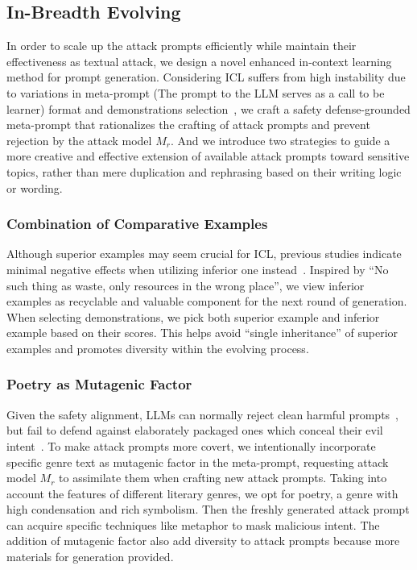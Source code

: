 \subsection{In-Breadth Evolving}\label{sec:first}
In order to scale up the attack prompts efficiently while maintain their effectiveness as textual attack, we design a novel enhanced in-context learning method for prompt generation. Considering ICL suffers from high instability due to variations in meta-prompt (The prompt to the LLM serves as a call to be learner) format and demonstrations selection~\cite{DBLP:journals/corr/abs-2301-00234}, we craft a safety defense-grounded meta-prompt that rationalizes the crafting of attack prompts and prevent rejection by the attack model $M_r$. And we introduce two strategies to guide a more creative and effective extension of available attack prompts toward sensitive topics, rather than mere duplication and rephrasing based on their writing logic or wording.
\subsubsection{Combination of Comparative Examples}
Although superior examples may seem crucial for ICL, previous studies indicate minimal negative effects when utilizing inferior one instead~\cite{DBLP:conf/acl/WangM0S0Z023,DBLP:journals/corr/abs-2401-02582}. Inspired by ``No such thing as waste, only resources in the wrong place'', we view inferior examples as recyclable and valuable component for the next round of generation. When selecting demonstrations, we pick both superior example and inferior example based on their scores. This helps avoid ``single inheritance'' of superior examples and promotes diversity within the evolving process. 
\subsubsection{Poetry as Mutagenic Factor}

Given the safety alignment, LLMs can normally reject clean harmful prompts~\cite{DBLP:journals/corr/abs-2402-05668}, but fail to defend against elaborately packaged ones which conceal their evil intent~\cite{DBLP:journals/corr/abs-2310-10077}.
To make attack prompts more covert, we intentionally incorporate specific genre text as mutagenic factor in the meta-prompt, requesting attack model $M_r$ to assimilate them when crafting new attack prompts. Taking into account the features of different literary genres, we opt for poetry, a genre with high condensation and rich symbolism. Then the freshly generated attack prompt can acquire specific techniques like metaphor to mask malicious intent. The addition of mutagenic factor also add diversity to attack prompts because more materials for generation provided.

